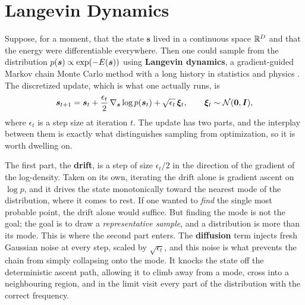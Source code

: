 \section{Langevin Dynamics}
\label{sec:bg-langevin}

Suppose, for a moment, that the state $\bm{s}$ lived in a continuous space $\mathbb{R}^D$ and that the energy were differentiable everywhere. Then one could sample from the distribution $p(\bm{s}) \propto \exp(-E(\bm{s}))$ using \textbf{Langevin dynamics}, a gradient-guided Markov chain Monte Carlo method with a long history in statistics and physics \citep{roberts1996exponential, welling2011bayesian}. The discretized update, which is what one actually runs, is
\begin{equation}
    \bm{s}_{t+1} = \bm{s}_t + \frac{\epsilon_t}{2}\,\nabla_{\bm{s}} \log p(\bm{s}_t) + \sqrt{\epsilon_t}\,\bm{\xi}_t, \qquad \bm{\xi}_t \sim \mathcal{N}(\bm{0}, \bm{I}),
    \label{eq:bg-langevin}
\end{equation}
where $\epsilon_t$ is a step size at iteration $t$. The update has two parts, and the interplay between them is exactly what distinguishes sampling from optimization, so it is worth dwelling on.

The first part, the \textbf{drift}, is a step of size $\epsilon_t/2$ in the direction of the gradient of the log-density. Taken on its own, iterating the drift alone is gradient ascent on $\log p$, and it drives the state monotonically toward the nearest mode of the distribution, where it comes to rest. If one wanted to \emph{find} the single most probable point, the drift alone would suffice. But finding the mode is not the goal; the goal is to draw a \emph{representative sample}, and a distribution is more than its mode. This is where the second part enters. The \textbf{diffusion} term injects fresh Gaussian noise at every step, scaled by $\sqrt{\epsilon_t}$, and this noise is what prevents the chain from simply collapsing onto the mode. It knocks the state off the deterministic ascent path, allowing it to climb away from a mode, cross into a neighbouring region, and in the limit visit every part of the distribution with the correct frequency.

